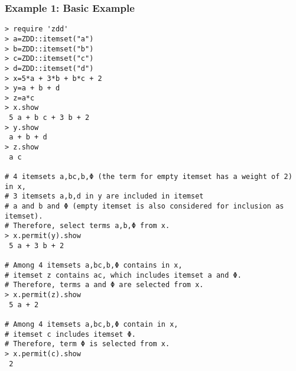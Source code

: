 \subsubsection*{Example 1: Basic Example}



\begin{Verbatim}[baselinestretch=0.7,frame=single]
> require 'zdd'
> a=ZDD::itemset("a")
> b=ZDD::itemset("b")
> c=ZDD::itemset("c")
> d=ZDD::itemset("d")
> x=5*a + 3*b + b*c + 2
> y=a + b + d
> z=a*c
> x.show
 5 a + b c + 3 b + 2
> y.show
 a + b + d
> z.show
 a c

# 4 itemsets a,bc,b,Φ (the term for empty itemset has a weight of 2) in x, 
# 3 itemsets a,b,d in y are included in itemset 
# a and b and Φ (empty itemset is also considered for inclusion as itemset).
# Therefore, select terms a,b,Φ from x. 
> x.permit(y).show
 5 a + 3 b + 2

# Among 4 itemsets a,bc,b,Φ contains in x, 
# itemset z contains ac, which includes itemset a and Φ. 
# Therefore, terms a and Φ are selected from x.
> x.permit(z).show
 5 a + 2

# Among 4 itemsets a,bc,b,Φ contain in x, 
# itemset c includes itemset Φ. 
# Therefore, term Φ is selected from x.
> x.permit(c).show
 2
\end{Verbatim}
